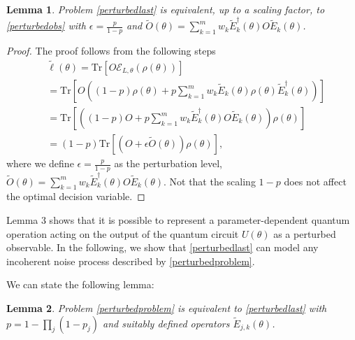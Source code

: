 \documentclass[letterpaper, 10 pt]{IEEEtran}  %
\newcommand{\Tr}{\mathrm{Tr}}
\newtheorem{lemma}{Lemma}
\begin{document}
\begin{lemma}
   Problem \eqref{perturbedlast} is equivalent, up to a scaling factor, to \eqref{perturbedobs} with $\epsilon=\frac{p}{1-p}$ and
   $\tilde{O}(\theta)=\sum_{k=1}^{m} w_k \tilde E_k^\dagger(\theta) O \tilde E_k(\theta)$.
\end{lemma}

\begin{proof}
The proof follows from the following steps
\begin{align}
    & \tilde{\ell} (\theta) = \Tr[O \mathcal{E}_{L,\theta}(\rho(\theta))] \nonumber \\
    & = \Tr[O ((1-p)\rho(\theta) + p \sum_{k=1}^{m} w_k \tilde E_k(\theta) \rho(\theta) \tilde E_k^\dagger(\theta))] \nonumber \\
    & = \Tr[((1-p)O + p \sum_{k=1}^{m} w_k \tilde E_k^\dagger(\theta)  O \tilde E_k(\theta))\rho(\theta)] \nonumber \\
    & = (1-p) \Tr[(O + \epsilon \tilde{O}(\theta))\rho(\theta)],
\end{align}
where we define $\epsilon=\frac{p}{1-p}$ as the perturbation level,
$\tilde{O}(\theta)=\sum_{k=1}^{m} w_k \tilde E_k^\dagger(\theta)  O \tilde E_k(\theta)$. 
Not that the scaling $1-p$ does not affect the optimal decision variable.
\end{proof}
Lemma 3 shows that it is possible to represent a parameter-dependent quantum operation acting on the output of the quantum circuit $U(\theta)$ as a perturbed observable. 
In the following, we show that \eqref{perturbedlast} can model any incoherent noise process described by \eqref{perturbedproblem}.

We can state the following lemma: 
\begin{lemma}
   Problem \eqref{perturbedproblem} is equivalent to \eqref{perturbedlast} with 
   $p=1-\prod_j (1-p_j)$ and suitably defined operators $\tilde{E}_{j,k}(\theta)$. 
\end{lemma}
\end{document}
